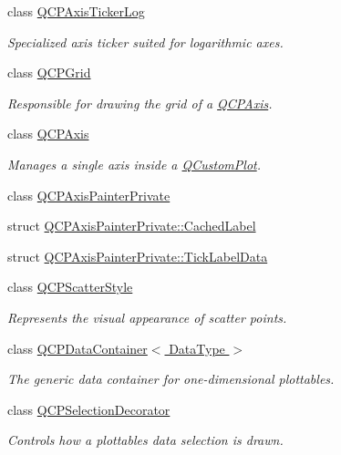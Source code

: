 \begin{DoxyCompactItemize}
class \hyperlink{class_q_c_p_axis_ticker_log}{Q\+C\+P\+Axis\+Ticker\+Log}
\begin{DoxyCompactList}\small\item\em Specialized axis ticker suited for logarithmic axes. \end{DoxyCompactList}\item 
class \hyperlink{class_q_c_p_grid}{Q\+C\+P\+Grid}
\begin{DoxyCompactList}\small\item\em Responsible for drawing the grid of a \hyperlink{class_q_c_p_axis}{Q\+C\+P\+Axis}. \end{DoxyCompactList}\item 
class \hyperlink{class_q_c_p_axis}{Q\+C\+P\+Axis}
\begin{DoxyCompactList}\small\item\em Manages a single axis inside a \hyperlink{class_q_custom_plot}{Q\+Custom\+Plot}. \end{DoxyCompactList}\item 
class \hyperlink{class_q_c_p_axis_painter_private}{Q\+C\+P\+Axis\+Painter\+Private}
\item 
struct \hyperlink{struct_q_c_p_axis_painter_private_1_1_cached_label}{Q\+C\+P\+Axis\+Painter\+Private\+::\+Cached\+Label}
\item 
struct \hyperlink{struct_q_c_p_axis_painter_private_1_1_tick_label_data}{Q\+C\+P\+Axis\+Painter\+Private\+::\+Tick\+Label\+Data}
\item 
class \hyperlink{class_q_c_p_scatter_style}{Q\+C\+P\+Scatter\+Style}
\begin{DoxyCompactList}\small\item\em Represents the visual appearance of scatter points. \end{DoxyCompactList}\item 
class \hyperlink{class_q_c_p_data_container}{Q\+C\+P\+Data\+Container$<$ Data\+Type $>$}
\begin{DoxyCompactList}\small\item\em The generic data container for one-\/dimensional plottables. \end{DoxyCompactList}\item 
class \hyperlink{class_q_c_p_selection_decorator}{Q\+C\+P\+Selection\+Decorator}
\begin{DoxyCompactList}\small\item\em Controls how a plottable\textquotesingle{}s data selection is drawn. \end{DoxyCompactList}\item 

\end{DoxyCompactItemize}
